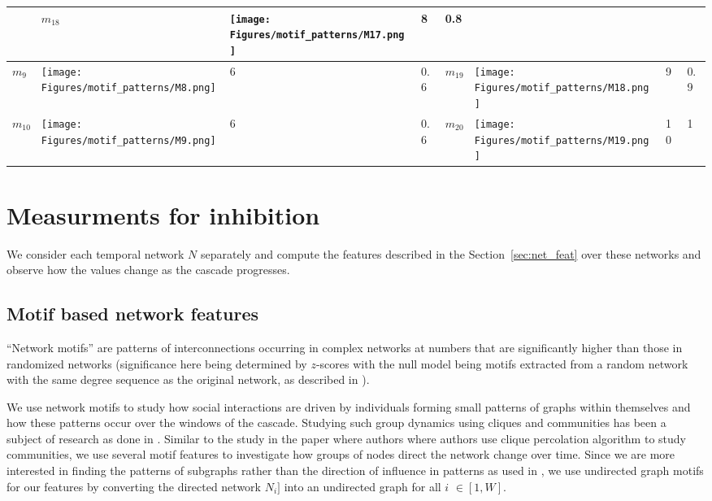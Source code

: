 \documentclass[smallextended]{svjour3}       %
\theoremstyle{definition}
\begin{document}
\begin{table}[t!]
\begin{tabular}{|p{1.2cm}|p{2cm}|p{0.8cm}|p{1.2cm}|p{1.2cm}|p{2cm}|p{0.8cm}|p{1.2cm}|}
		& $m_{18}$ & \parbox[c]{1em}{
			\texttt{[image: Figures/motif\_patterns/M17.png]}} & 8 & 0.8
		\\
		\hline
		\hline $m_9$ & \parbox[c]{1em}{
			\texttt{[image: Figures/motif\_patterns/M8.png]}} & 6 & 0.6
		& $m_{19}$ & \parbox[c]{1em}{
			\texttt{[image: Figures/motif\_patterns/M18.png]}} & 9 & 0.9
		\\
		\hline
		\hline $m_{10}$ & \parbox[c]{1em}{
			\texttt{[image: Figures/motif\_patterns/M9.png]}} & 6 & 0.6 
		& $m_{20}$ & \parbox[c]{1em}{
			\texttt{[image: Figures/motif\_patterns/M19.png]}} & 10 & 1
		\\
		\hline
	\end{tabular}
	\renewcommand{\arraystretch}{4}
\end{table}

\section{Measurments for inhibition}
We consider each temporal network $N$ separately and compute the features described in the  Section~\ref{sec:net_feat} over these networks and observe how the values change as the cascade progresses.
\label{sec:net_feat}
\subsection{Motif based network features}
``Network motifs'' are patterns of interconnections
occurring in complex networks at numbers that are significantly
higher than those in randomized networks (significance here being determined by $z$-scores with the null model being motifs extracted from a random network with the same degree sequence as the original network, as described in \cite{milo_motif}). 

 We use network motifs to study how social interactions are driven by individuals forming small patterns of graphs within themselves and how these patterns occur over the windows of the cascade. Studying such group dynamics using cliques and communities has been a subject of research as done in \cite{group_dyn}. Similar to the study in the paper where authors where authors use clique percolation algorithm to study communities, we use several motif features to investigate how groups of nodes direct the network change over time. Since we are more interested in finding the patterns of subgraphs rather than the direction of influence in patterns as used in \cite{leskovic_bib}, we use undirected graph motifs for our features by converting the directed network $N_i]$ into an undirected graph for all $i$ $\in [1,W]$.  
\end{document}

